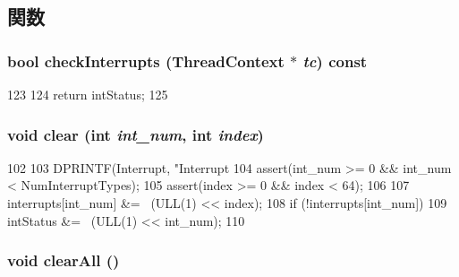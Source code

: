 \subsection{関数}
\hypertarget{classSparcISA_1_1Interrupts_af3c66fb49fec598cf78aaec29d764952}{
\subsubsection[{checkInterrupts}]{\setlength{\rightskip}{0pt plus 5cm}bool checkInterrupts ({\bf ThreadContext} $\ast$ {\em tc}) const}}
\label{classSparcISA_1_1Interrupts_af3c66fb49fec598cf78aaec29d764952}



\begin{DoxyCode}
123     {
124         return intStatus;
125     }
\end{DoxyCode}
\hypertarget{classSparcISA_1_1Interrupts_af60c3484087379d0330467d77f6cbaae}{
\subsubsection[{clear}]{\setlength{\rightskip}{0pt plus 5cm}void clear (int {\em int\_\-num}, \/  int {\em index})}}
\label{classSparcISA_1_1Interrupts_af60c3484087379d0330467d77f6cbaae}



\begin{DoxyCode}
102     {
103         DPRINTF(Interrupt, "Interrupt %
104         assert(int_num >= 0 && int_num < NumInterruptTypes);
105         assert(index >= 0 && index < 64);
106 
107         interrupts[int_num] &= ~(ULL(1) << index);
108         if (!interrupts[int_num])
109             intStatus &= ~(ULL(1) << int_num);
110     }
\end{DoxyCode}
\hypertarget{classSparcISA_1_1Interrupts_a798729dca95209ecdc609807a653a2bf}{
\subsubsection[{clearAll}]{\setlength{\rightskip}{0pt plus 5cm}void clearAll ()}}
\label{classSparcISA_1_1Interrupts_a798729dca95209ecdc609807a653a2bf}



